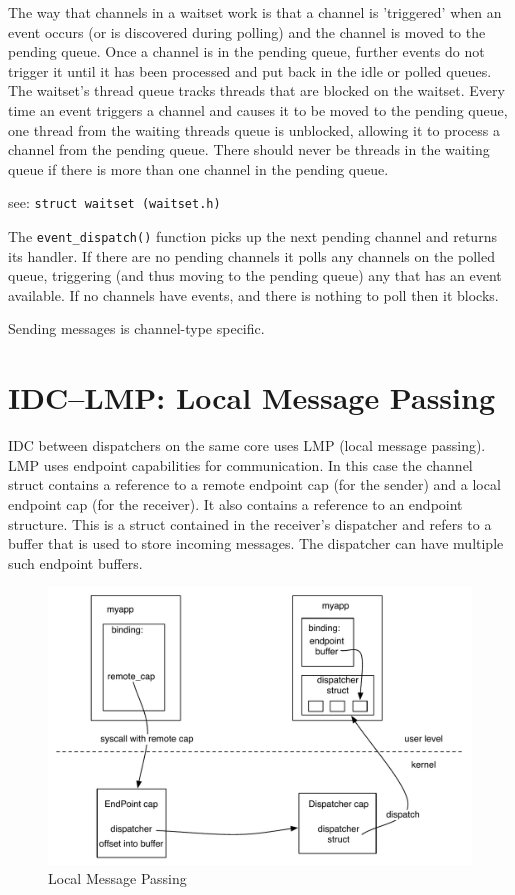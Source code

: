 \documentclass[a4paper,twoside]{report} %
\begin{document}
The way that channels in a waitset work is that a channel is 'triggered' when an
event occurs (or is discovered during polling) and the channel is moved to the
pending queue. Once a channel is in the pending queue, further events do not
trigger it until it has been processed and put back in the idle or polled
queues. The waitset's thread queue tracks threads that are blocked on the
waitset. Every time an event triggers a channel and causes it to be moved to the
pending queue, one thread from the waiting threads queue is unblocked, allowing
it to process a channel from the pending queue. There should never be threads in
the waiting queue if there is more than one channel in the pending queue.

see: \texttt{struct waitset (waitset.h)}

The \texttt{event\_dispatch()} function picks up the next pending channel and
returns its handler. If there are no pending channels it polls any channels on
the polled queue, triggering (and thus moving to the pending queue) any that has
an event available. If no channels have events, and there is nothing to poll
then it blocks.

Sending messages is channel-type specific.

\section{IDC\---LMP: Local Message Passing}
IDC between dispatchers on the same core uses LMP (local message passing).  LMP
uses endpoint capabilities for communication.  In this case the channel struct
contains a reference to a remote endpoint cap (for the sender) and a local
endpoint cap (for the receiver). It also contains a reference to an endpoint
structure. This is a struct contained in the receiver's dispatcher and refers to
a buffer that is used to store incoming messages. The dispatcher can have
multiple such endpoint buffers.

\begin{figure}
  \begin{center}
    \includegraphics[width=0.5\columnwidth]{LMP.pdf}
  \end{center}
  \caption{Local Message Passing}
  \label{fig:lmp}
\end{figure}
\end{document}
